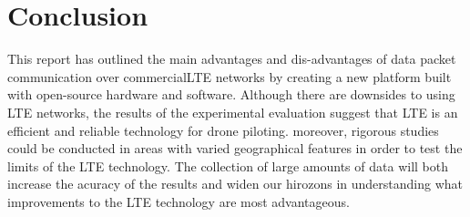 \documentclass{IEEEtran}
\begin{document}
\section{Conclusion}
This  report  has  outlined  the  main  advantages  and  dis-advantages  of  data  packet  communication  over  commercialLTE  networks  by  creating  a  new  platform  built  with  open-source  hardware  and  software.  Although  there  are  downsides  to  using  LTE  networks, the results of the experimental evaluation suggest that LTE is an efficient and reliable technology for drone piloting. moreover, rigorous studies could be conducted in areas with varied geographical features in order to test the limits of the LTE technology. The collection of large amounts of data will both increase the acuracy of the results and widen our hirozons in understanding what improvements to the LTE technology are most advantageous.\par
\clearpage
\newpage


\end{document}
